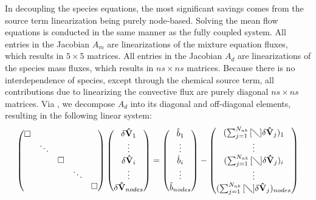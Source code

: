 In decoupling the species equations, the most significant savings comes from the
source term linearization being purely node-based\cite{gnoffo-tp}.  Solving the
mean flow equations is conducted in the same manner as the fully coupled system.
All entries in the Jacobian $A_m$ are linearizations of the mixture equation
fluxes, which results in $5\times5$ matrices. All entries in the Jacobian $A_d$
are linearizations of the species mass fluxes, which results in $ns \times ns$
matrices.  Because there is no interdependence of species, except through the
chemical source term, all contributions due to linearizing the convective flux
are purely diagonal $ns \times ns$ matrices.  Via , we
decompose $A_d$ into its diagonal and off-diagonal elements, resulting in the
following linear system:
\begin{equation}
  \label{dc_sys} 
  \begin{pmatrix} 
    \Box & & & & \\ & \ddots & & & \\ & & \Box \\ & & & \ddots & \\ & & & & \Box
  \end{pmatrix}
  \begin{pmatrix}
    \delta \mathbf{\hat{V}}_1 \\ \vdots \\ \delta \mathbf{\hat{V}}_i \\ 
    \vdots \\ \delta \mathbf{\hat{V}}_{nodes}
  \end{pmatrix}
  =
  \begin{pmatrix}
    \hat{b}_1 \\ \vdots \\ \hat{b}_i \\ \vdots \\ \hat{b}_{nodes} 
  \end{pmatrix}
  -
  \begin{pmatrix}
    (\sum_{j=1}^{N_{nb}}{[\diagdown] \delta\mathbf{\hat{V}}_{j}})_1 \\ \vdots \\
    (\sum_{j=1}^{N_{nb}}{[\diagdown] \delta\mathbf{\hat{V}}_{j}})_i \\ \vdots \\
    (\sum_{j=1}^{N_{nb}}{[\diagdown] \delta\mathbf{\hat{V}}_{j}})_{nodes}
  \end{pmatrix} 
\end{equation} 
